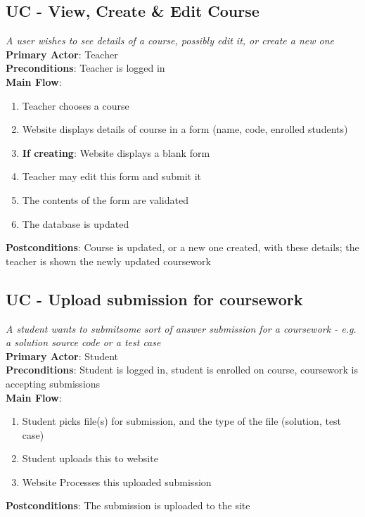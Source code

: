 \documentclass[a4paper,11pt]{report}
\begin{document}
\subsection*{UC - View, Create \& Edit Course}
\textit{A user wishes to see details of a course, possibly edit it, or create a new one}\\
\textbf{Primary Actor}: Teacher\\
\textbf{Preconditions}: Teacher is logged in\\
\textbf{Main Flow}:
\begin{enumerate}
\item Teacher chooses a course
\item Website displays details of course in a form (name, code, enrolled students)
\item \textbf{If creating}: Website displays a blank form
\item Teacher may edit this form and submit it
\item The contents of the form are validated
\item The database is updated
\end{enumerate}
\textbf{Postconditions}: Course is updated, or a new one created, with these details; the teacher is shown the newly updated coursework

\subsection*{UC - Upload submission for coursework}
\textit{A student wants to submitsome sort of answer submission for a coursework - e.g. a solution source code or a test case}\\
\textbf{Primary Actor}: Student\\
\textbf{Preconditions}: Student is logged in, student is enrolled on course, coursework is accepting submissions\\
\textbf{Main Flow}:
\begin{enumerate}
\item Student picks file(s) for submission, and the type of the file (solution, test case)
\item Student uploads this to website
\item Website Processes this uploaded submission
\end{enumerate}
\textbf{Postconditions}: The submission is uploaded to the site
\end{document}
